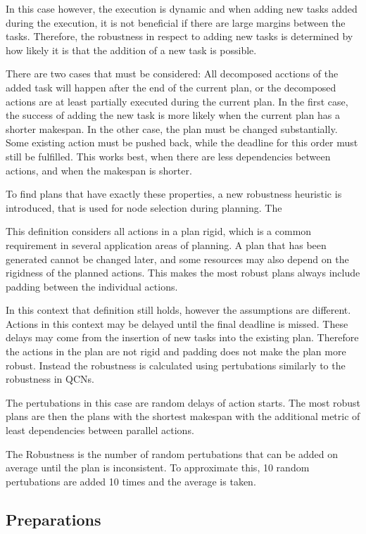 In this case however, the execution is dynamic and when adding new tasks added during the execution, it is not beneficial if there are large margins between the tasks.
Therefore, the robustness in respect to adding new tasks is determined by how likely it is that the addition of a new task is possible.

There are two cases that must be considered: All decomposed acctions of the added task will happen after the end of the current plan, or the decomposed actions are at least partially executed during the current plan.
In the first case, the success of adding the new task is more likely when the current plan has a shorter makespan.
In the other case, the plan must be changed substantially.
Some existing action must be pushed back, while the deadline for this order must still be fulfilled.
This works best, when there are less dependencies between actions, and when the makespan is shorter.

To find plans that have exactly these properties, a new robustness heuristic is introduced, that is used for node selection during planning.
The 

This definition considers all actions in a plan rigid, which is a common requirement in several application areas of planning.
A plan that has been generated cannot be changed later, and some resources may also depend on the rigidness of the planned actions. 
This makes the most robust plans always include padding between the individual actions.

In this context that definition still holds, however the assumptions are different.
Actions in this context may be delayed until the final deadline is missed.
These delays may come from the insertion of new tasks into the existing plan.
Therefore the actions in the plan are not rigid and padding does not make the plan more robust.
Instead the robustness is calculated using pertubations similarly to the robustness in QCNs.

The pertubations in this case are random delays of action starts.
The most robust plans are then the plans with the shortest makespan with the additional metric of least dependencies between parallel actions.


The Robustness is the number of random pertubations that can be added on average until the plan is inconsistent.
To approximate this, 10 random pertubations are added 10 times and the average is taken.


\subsection{Preparations}

